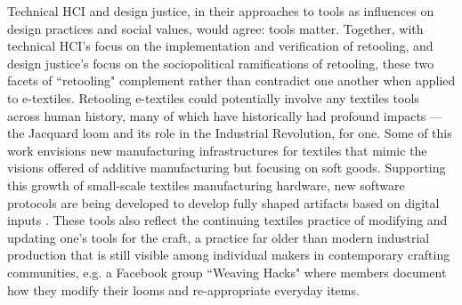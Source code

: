 Technical HCI and design justice, in their approaches to tools as influences on design practices and social values, would agree: tools matter. Together, with technical HCI's focus on the implementation and verification of retooling, and design justice's focus on the sociopolitical ramifications of retooling, these two facets of ``retooling" complement rather than contradict one another when applied to e-textiles. Retooling e-textiles could potentially involve any textiles tools across human history, many of which have historically had profound impacts --- the Jacquard loom and its role in the Industrial Revolution, for one. Some of this work envisions new manufacturing infrastructures for textiles that mimic the visions offered of additive manufacturing but focusing on soft goods. 
Supporting this growth of small-scale textiles manufacturing hardware, new software protocols are being developed to develop fully shaped artifacts based on digital inputs \cite{albaugh_digital_2019, mccann_compiler_2016}. These tools also reflect the continuing textiles practice of modifying and updating one's tools for the craft, a practice far older than modern industrial production that is still visible among individual makers in contemporary crafting communities, e.g. a Facebook group ``Weaving Hacks" \cite{facebook_group_weaving_nodate} where members document how they modify their looms and re-appropriate everyday items.


